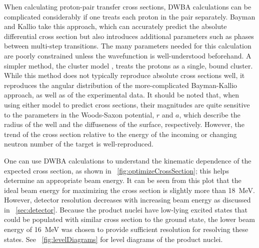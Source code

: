 When calculating proton-pair transfer cross sections, DWBA calculations can be complicated considerably if one treats each proton in the pair separately.  Bayman and Kallio \citep{BaymanKallio} take this approach, which can accurately predict the absolute differential cross section but also introduces additional parameters such as phases between multi-step transitions.  The many parameters needed for this calculation are poorly constrained unless the wavefunction is well-understood beforehand.  A simpler method, the cluster model \citep{NuclearReactions}, treats the protons as a single, bound cluster.  While this method does not typically reproduce absolute cross sections well, it reproduces the angular distribution of the more-complicated Bayman-Kallio approach, as well as of the experimental data.  It should be noted that, when using either model to predict cross sections, their magnitudes are quite sensitive to the parameters in the Woods-Saxon potential, $r$ and $a$, which describe the radius of the well and the diffuseness of the surface, respectively.  However, the trend of the cross section relative to the energy of the incoming  or changing neutron number of the target is well-reproduced.

One can use DWBA calculations to understand the kinematic dependence of the expected cross section, as shown in {\fig}~\ref{fig:optimizeCrossSection}; this helps determine an appropriate beam energy.  It can be seen from this plot that the ideal beam energy for maximizing the \reaction cross section is slightly more than 18~MeV.  However, detector resolution decreases with increasing beam energy as discussed in {\sect}~\ref{sec:detector}.  Because the product nuclei \SeProducts have low-lying excited \tp states that could be populated with similar cross section to the ground state, the lower beam energy of 16~MeV was chosen to provide sufficient resolution for resolving these states.  See {\fig}~\ref{fig:levelDiagrams} for level diagrams of the product nuclei.  


